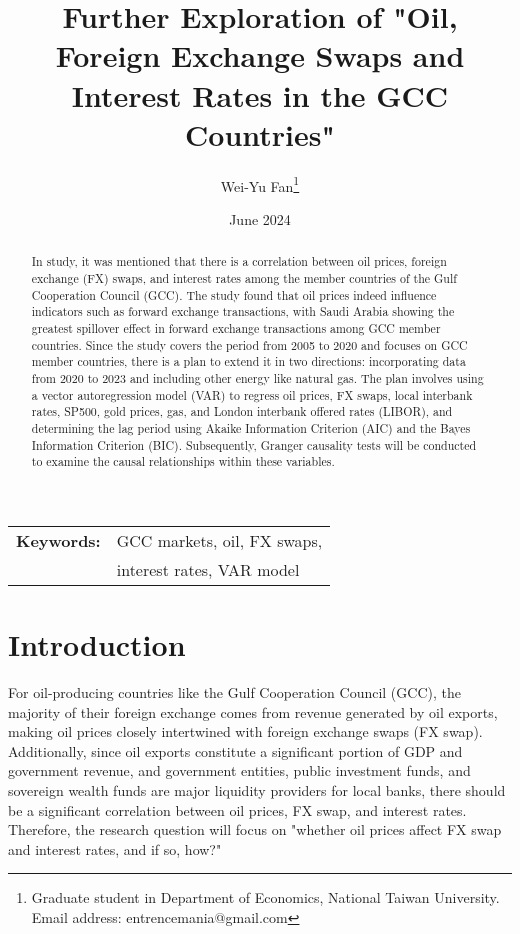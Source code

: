 \documentclass[12pt]{article}
\title{Further Exploration of "Oil, Foreign Exchange Swaps and Interest Rates in the GCC Countries"}
\author{Wei-Yu Fan\thanks{
Graduate student in Department of Economics, National Taiwan University.\\ 
Email address: entrencemania@gmail.com
}
}
\date{June 2024}
\begin{document}
\maketitle
\begin{sloppypar}
\begin{spacing}{0}
\begin{abstract}
\noindent 
In \textcite{almaskati2022oil} study, it was mentioned that there is a correlation between oil prices, foreign exchange (FX) swaps, and interest rates among the member countries of the Gulf Cooperation Council (GCC). The study found that oil prices indeed influence indicators such as forward exchange transactions, with Saudi Arabia showing the greatest spillover effect in forward exchange transactions among GCC member countries. Since the study covers the period from 2005 to 2020 and focuses on GCC member countries, there is a plan to extend it in two directions: incorporating data from 2020 to 2023 and including other energy like natural gas. The plan involves using a vector autoregression model (VAR) to regress oil prices, FX swaps, local interbank rates, SP500, gold prices, gas, and London interbank offered rates (LIBOR), and determining the lag period using Akaike Information Criterion (AIC) and the Bayes Information Criterion (BIC). Subsequently, Granger causality tests will be conducted to examine the causal relationships within these variables.
\end{abstract}
\end{spacing}

\begin{tabular}{rl}
    \\
    \textbf{Keywords:} &GCC markets, oil, FX swaps, \\
    &interest rates, VAR model\\
\end{tabular}


\section{Introduction}
For oil-producing countries like the Gulf Cooperation Council (GCC), the majority of their foreign exchange comes from revenue generated by oil exports, making oil prices closely intertwined with foreign exchange swaps (FX swap). Additionally, since oil exports constitute a significant portion of GDP and government revenue, and government entities, public investment funds, and sovereign wealth funds are major liquidity providers for local banks, there should be a significant correlation between oil prices, FX swap, and interest rates. Therefore, the research question will focus on "whether oil prices affect FX swap and interest rates, and if so, how?"


\end{sloppypar}
\end{document}
